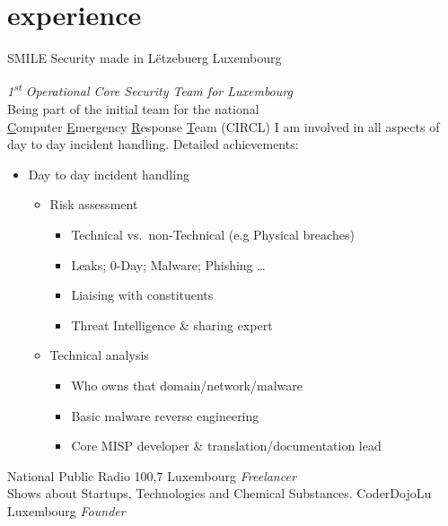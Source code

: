 \documentclass[a4paper]{friggeri-cv} %
\begin{document}
\section{experience}
\begin{entrylist}
{SMILE Security made in L\"{e}tzebuerg}
{Luxembourg}
{\emph{1\textsuperscript{st} Operational Core Security Team for Luxembourg} \\
Being part of the initial team for the national \\
\underline{C}omputer \underline{E}mergency \underline{R}esponse \underline{T}eam (CIRCL) I am involved in all aspects of day to day incident handling. Detailed achievements:
\begin{itemize}
    \item Day to day incident handling
    \begin{itemize}
        \item Risk assessment
        \begin{itemize}
        	\item Technical vs.\ non-Technical (e.g Physical breaches)
          \item Leaks; 0-Day; Malware; Phishing \ldots
          \item Liaising with constituents
          \item Threat Intelligence \& sharing expert
        \end{itemize}
        \item Technical analysis
        \begin{itemize}
             \item Who owns that domain/network/malware
             \item Basic malware reverse engineering
             \item Core MISP developer \& translation/documentation lead
        \end{itemize}
    \end{itemize}
\end{itemize}}
{National Public Radio 100,7}
{Luxembourg}
{\emph{Freelancer} \\
Shows about Startups, Technologies and Chemical Substances.}
{CoderDojoLu}
{Luxembourg}
{\emph{Founder} \\
}
\end{entrylist}
\end{document}
